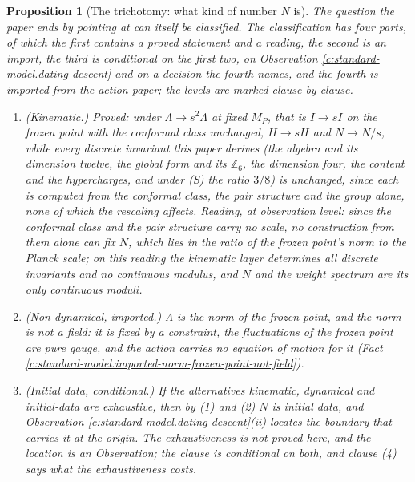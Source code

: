 \documentclass[11pt]{article}
\newtheorem{proposition}[theorem]{Proposition}
\theoremstyle{definition}
\theoremstyle{plain}
\newcommand{\changedmark}[2]{\marginpar{\raggedright\scriptsize\color{#1}#2}}
\begin{document}
\begin{proposition}[The trichotomy: what kind of number $N$ is]\label{c:standard-model.trichotomy-what-kind-number}
\changedmark{BrickRed}{corrected since the deposit}
The question the paper ends by pointing at can itself be classified. The classification has four parts, of which the first contains a proved statement and a reading, the second is an import, the third is conditional on the first two, on Observation \ref{c:standard-model.dating-descent} and on a decision the fourth names, and the fourth is imported from the action paper; the levels are marked clause by clause.
\begin{enumerate}
\item \emph{(Kinematic.)} Proved: under $\Lambda \to s^{2}\Lambda$ at fixed $M_{P}$, that is $I \to sI$ on the frozen point with the conformal class unchanged, $H \to sH$ and $N \to N/s$, while every discrete invariant this paper derives (the algebra and its dimension twelve, the global form and its $\mathbb{Z}_{6}$, the dimension four, the content and the hypercharges, and under (S) the ratio $3/8$) is unchanged, since each is computed from the conformal class, the pair structure and the group alone, none of which the rescaling affects. Reading, at observation level: since the conformal class and the pair structure carry no scale, no construction from them alone can fix $N$, which lies in the ratio of the frozen point's norm to the Planck scale; on this reading the kinematic layer determines all discrete invariants and no continuous modulus, and $N$ and the weight spectrum are its only continuous moduli.
\item \emph{(Non-dynamical, imported.)} $\Lambda$ is the norm of the frozen point, and the norm is not a field: it is fixed by a constraint, the fluctuations of the frozen point are pure gauge, and the action carries no equation of motion for it (Fact \ref{c:standard-model.imported-norm-frozen-point-not-field}).
\item \emph{(Initial data, conditional.)} If the alternatives kinematic, dynamical and initial-data are exhaustive, then by (1) and (2) $N$ is initial data, and Observation \ref{c:standard-model.dating-descent}(ii) locates the boundary that carries it at the origin. The exhaustiveness is not proved here, and the location is an Observation; the clause is conditional on both, and clause (4) says what the exhaustiveness costs.

\end{enumerate}
\end{proposition}
\end{document}
